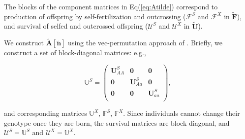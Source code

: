 \documentclass[11pt]{article}
\def\mbf#1{\mathbf{#1}}
\def\mbb#1{\mathbb{#1}}
\def\mcal#1{\mathcal{#1}}
\begin{document}
\noindent The blocks of the component matrices in Eq(\ref{eq:Atilde}) correspond to production of offspring by self-fertilization and outcrossing ($\mcal{F}^S$ and $\mcal{F}^X$ in $\tilde{\mbf{F}}$), and survival of selfed and outcrossed offspring ($\mcal{U}^S$ and $\mcal{U}^X$ in $\tilde{\mbf{U}}$). 

We construct $\tilde{\mbf{A}}[\tilde{\mbf{n}}]$ using the vec-permutation approach of \citet{CaswellEtAl2018}. Briefly, we construct a set of block-diagonal matrices: e.g.,
\begin{linenomath*}
\begin{equation} \label{eq:BlkUS}
	\mbb{U}^S = 
		\left(
			\begin{array}{ccc}
				\mbf{U}^{S}_{AA} & \mbf{0} & \mbf{0} \\
				\mbf{0} & \mbf{U}^{S}_{Aa} & \mbf{0} \\
				\mbf{0} & \mbf{0} & \mbf{U}^{S}_{aa} \\
			\end{array} \right),
\end{equation}
\end{linenomath*}

\noindent and corresponding matrices $\mbb{U}^X$, $\mbb{F}^S$, $\mbb{F}^X$. Since individuals cannot change their genotype once they are born, the survival matrices are block diagonal, and $\mcal{U}^S = \mbb{U}^S$ and $\mcal{U}^X = \mbb{U}^X$. 
\end{document}
